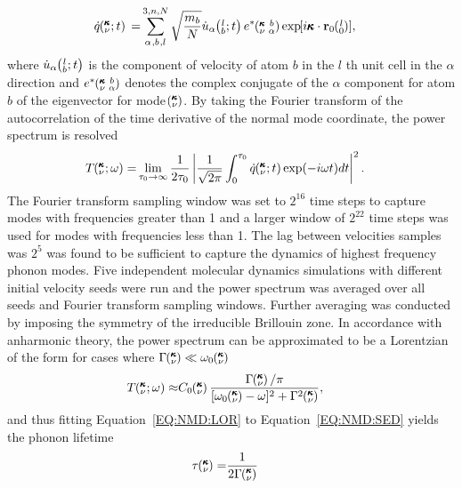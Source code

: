 \documentclass[aps,prb,preprint,preprintnumbers,amsmath,amssymb,floatfix,superscriptaddress]{revtex4}
\newcommand{\EXP}[1]{\exp\mspace{-5.0mu}\left[#1\right]\mspace{-3.0mu}}
\newcommand{\SUM}[2]{\ifthenelse{\equal{#1}{0}}{\sum_{
\alpha_{#2},b_{#2},l_{#2}}^{3,n,N}} {\ifthenelse{\equal{#1}{1}}{\sum_{
\alpha_{#2},b_{#2}}^{3,n}}{\sum_{\pmb{\kappa}#2,\nu#2}^{N,3n}}}}
\newcommand{\ab}[2]{\mspace{-4.0mu}\left(\mspace{-8.0mu}
\begin{smallmatrix}&\ifthenelse{\equal{#1}{}}{a}{#1} \\&\ifthenelse
{\equal{#2}{}}{b}{#2}\end{smallmatrix}\mspace{-3.0mu}\right)}
\newcommand{\kvba}{\mspace{-4.0mu}\left(\mspace{-8.0mu}
\begin{smallmatrix} &\pmb{\kappa} &b \\ &\nu &\alpha\end{smallmatrix}
\mspace{-3.0mu}\right)}
\newcommand{\kvt}{\mspace{-4.0mu}\left(\mspace{-8.0mu}
\begin{smallmatrix}&\pmb{\kappa} \\&\nu\end{smallmatrix}
\mspace{-2.0mu};t\right)}
\newcommand{\kvw}{\mspace{-4.0mu}\left(\mspace{-8.0mu}
\begin{smallmatrix}&\pmb{\kappa} \\&\nu\end{smallmatrix}
\mspace{-2.0mu};\omega\right)}
\newcommand{\kv}{\mspace{-4.0mu}\left(\mspace{-8.0mu}
\begin{smallmatrix}&\pmb{\kappa} \\&\nu\end{smallmatrix}
\mspace{-3.0mu}\right)}
\newcommand{\lbt}{\mspace{-4.0mu}\left(\mspace{-8.0mu}
\begin{smallmatrix}&l \\&b\end{smallmatrix}\mspace{-2.0mu};t\right)}
\begin{document}
\begin{equation}\label{EQ:NMD:qdot}
\begin{split}
\dot{q}\kvt{}{}{}=&\SUM{0}{}\sqrt{\frac{m_b}{N}}\dot{u}_{\alpha}\lbt e^*\kvba\EXP{i\pmb{\kappa}\cdot\mathbf{r}_0\ab{l}{0}},
\end{split}
\end{equation}
where $\dot{u}_{\alpha}\lbt$ is the component of velocity of atom $b$ in the $l$ th unit cell in the $\alpha$ direction and $e^*\kvba$ denotes the complex conjugate of the $\alpha$ component for atom $b$ of the eigenvector for mode $\kv$. By taking the Fourier transform of the autocorrelation of the time derivative of the normal mode coordinate, the power spectrum is resolved \cite{dove_introduction_1993-3}
\begin{equation}\label{EQ:NMD:SED}
\begin{split}
T\kvw=&\lim_{\tau_0\rightarrow\infty}\frac{1}{2\tau_0}\left|\frac{1}{\sqrt{2\pi}}\int_{0}^{\tau_0}\dot{q}\kvt\exp(-i\omega t)dt\right|^2.
\end{split}
\end{equation}
The Fourier transform sampling window was set to $2^{16}$ time steps to capture modes with frequencies greater than 1 and a larger window of $2^{22}$ time steps was used for modes with frequencies less than 1. The lag between velocities samples was $2^5$ was found to be sufficient to capture the dynamics of highest frequency phonon modes. Five independent molecular dynamics simulations with different initial velocity seeds were run and the power spectrum was averaged over all seeds and Fourier transform sampling windows. Further averaging was conducted by imposing the symmetry of the irreducible Brillouin zone. In accordance with anharmonic theory, the power spectrum can be approximated to be a Lorentzian of the form for cases where $\Gamma\kv \ll \omega_0\kv$ \cite{maradudin_scattering_1962}
\begin{equation}\label{EQ:NMD:LOR}
\begin{split}
T\kvw\approx&C_0\kv\frac{\Gamma\kv/\pi}{[\omega_0\kv-\omega]^2+\Gamma^2\kv},
\end{split}
\end{equation}
and thus fitting Equation~\ref{EQ:NMD:LOR} to Equation~\ref{EQ:NMD:SED} yields the phonon lifetime
\begin{equation}\label{EQ:lifetime}
\begin{split}
\tau\kv=&\frac{1}{2\Gamma\kv}
\end{split}
\end{equation}
\end{document}
